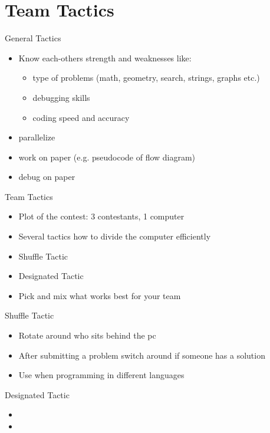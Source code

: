 \documentclass[11pt,pdf, aspectratio=169]{beamer}
\begin{document}
  \section{Team Tactics}
  \begin{frame}{General Tactics}
    \begin{itemize}
      \item Know each-others strength and weaknesses like:
      \begin{itemize}
        \item type of problems (math, geometry, search, strings, graphs etc.)
        \item debugging skills
        \item coding speed and accuracy
      \end{itemize}
      \item parallelize
      \item work on paper (e.g. pseudocode of flow diagram)
      \item debug on paper
    \end{itemize}
  \end{frame}
  \begin{frame}{Team Tactics}
    \begin{itemize}
      \item<1-> Plot of the contest: 3 contestants, 1 computer
      \item<2-> Several tactics how to divide the computer efficiently
      \item<3-> Shuffle Tactic
      \item<3-> Designated Tactic
      \item<3-> Pick and mix what works best for your team
    \end{itemize}
  \end{frame}
  \begin{frame}{Shuffle Tactic}
    \begin{itemize}
      \item Rotate around who sits behind the pc
      \item After submitting a problem switch around if someone has a solution
      \item Use when programming in different languages
    \end{itemize}
  \end{frame}
  \begin{frame}{Designated Tactic}
    \begin{itemize}
      \item
      \item
    \end{itemize}
  \end{frame}
\end{document}
